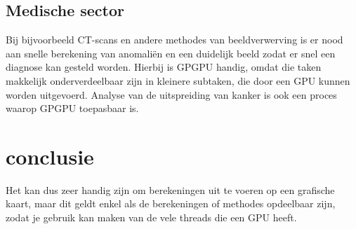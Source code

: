 \documentclass[11pt, a4paper]{article}
\begin{document}
\subsection{Medische sector}

Bij bijvoorbeeld CT-scans en andere methodes van beeldverwerving is er nood aan snelle berekening van anomali\"en en een duidelijk beeld zodat er snel een diagnose kan gesteld worden. Hierbij is GPGPU handig, omdat die taken makkelijk onderverdeelbaar zijn in kleinere subtaken, die door een GPU kunnen worden uitgevoerd. Analyse van de uitspreiding van kanker is ook een proces waarop GPGPU toepasbaar is.

\section{conclusie}

Het kan dus zeer handig zijn om berekeningen uit te voeren op een grafische kaart, maar dit geldt enkel als de berekeningen of methodes opdeelbaar zijn, zodat je gebruik kan maken van de vele threads die een GPU heeft.

\newpage
\end{document}
